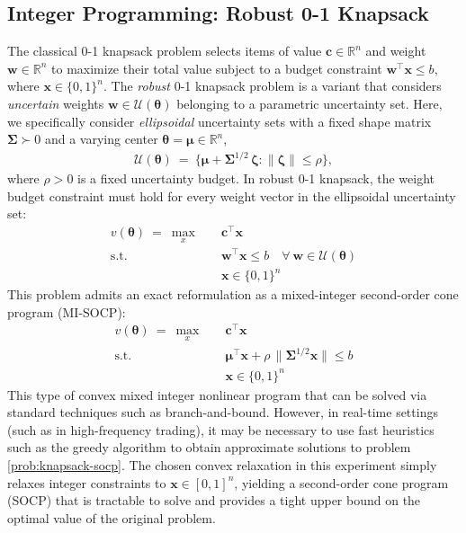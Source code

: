 \documentclass[10pt]{article} %
\theoremstyle{plain}
\theoremstyle{definition}
\theoremstyle{remark}
\begin{document}
\subsection{Integer Programming: Robust 0-1 Knapsack}

The classical 0-1 knapsack problem selects items of value $\mathbf{c} \in \mathbb{R}^n$ and weight $\mathbf{w} \in \mathbb{R}^n$ to maximize their total value subject to a budget constraint $\mathbf{w}^\top \mathbf{x} \leq b$, where $\mathbf{x} \in \{0, 1\}^n$.
The \textit{robust} 0-1 knapsack problem is a variant that considers \textit{uncertain} weights $\mathbf{w} \in \mathcal{U}(\bm{\theta})$ belonging to a parametric uncertainty set.
Here, we specifically consider \textit{ellipsoidal} uncertainty sets with a fixed shape matrix $\bm{\Sigma} \succ 0$ and a varying center $\bm{\theta} = \bm{\mu} \in \mathbb{R}^{n}$,
\begin{align*}
    \mathcal{U}(\bm{\theta}) ~=~ \{ \bm{\mu} + \bm{\Sigma}^{1/2} \, \bm{\zeta} : \| \bm{\zeta} \| \leq \rho \},
\end{align*}
where $\rho > 0$ is a fixed uncertainty budget. In robust 0-1 knapsack, the weight budget constraint must hold for every weight vector in the ellipsoidal uncertainty set:
\begin{equation}
\begin{aligned}
    v(\bm{\theta}) ~=~ \max_{x} \quad & \mathbf{c}^\top \mathbf{x} \\
    \text{s.t.} \quad & \mathbf{w}^\top \mathbf{x} \leq b \quad \forall ~ \mathbf{w} \in \mathcal{U}(\bm{\theta}) \\[3pt]
    & \mathbf{x} \in \{0, 1\}^n
\end{aligned}
\label{prob:knapsack}
\end{equation}
This problem admits an exact reformulation as a mixed-integer second-order cone program (MI-SOCP):
\begin{equation}
\begin{aligned}
    v(\bm{\theta}) ~=~ \max_{x} \quad & \mathbf{c}^\top \mathbf{x} \\
    \text{s.t.} \quad & \bm{\mu}^\top \mathbf{x} + \rho\,\|\bm{\Sigma}^{1/2}\mathbf{x}\| \leq b \\[3pt]
    & \mathbf{x} \in \{0,1\}^n
\end{aligned}
\label{prob:knapsack-socp}
\end{equation}
This type of convex mixed integer nonlinear program that can be solved via standard techniques such as branch-and-bound. However, in real-time settings (such as in high-frequency trading), it may be necessary to use fast heuristics such as the greedy algorithm to obtain approximate solutions to problem \cref{prob:knapsack-socp}{}{}.
The chosen convex relaxation in this experiment simply relaxes integer constraints to $\mathbf{x} \in [0, 1]^n$, yielding a second-order cone program (SOCP) that is tractable to solve and provides a tight upper bound on the optimal value of the original problem.
\end{document}
